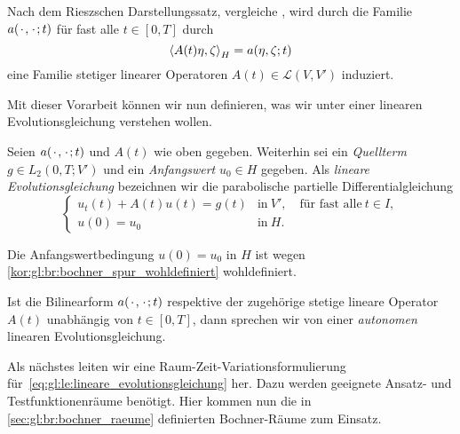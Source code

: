 Nach dem Rieszschen Darstellungssatz, vergleiche \cite[Theorem \S{}22.1]{Halmos:1957vd}, wird durch die Familie $a({\mkern2mu\cdot\mkern2mu}, {\mkern2mu\cdot\mkern2mu}; t)$ für fast alle $t \in [0, T]$ durch
\begin{equation}
    \left\langle A(t)\eta,\zeta\right\rangle_{H} = a(\eta, \zeta; t)
\end{equation}
eine Familie stetiger linearer Operatoren $A(t) \in \mathcal L(V, V')$ induziert.

Mit dieser Vorarbeit können wir nun definieren, was wir unter einer linearen Evolutionsgleichung verstehen wollen.

\begin{Definition}
\label{def:gl:le:lineare_evolutionsgleichung}
    Seien $a({\mkern2mu\cdot\mkern2mu}, {\mkern2mu\cdot\mkern2mu}; t)$ und $A(t)$ wie oben gegeben.
    Weiterhin sei ein \emph{Quellterm} $g \in L_{2}(0, T; V')$ und ein \emph{Anfangswert} $u_{0} \in H$ gegeben.
    Als \emph{lineare Evolutionsgleichung} bezeichnen wir die parabolische partielle Differentialgleichung
    \begin{equation}
        \label{eq:gl:le:lineare_evolutionsgleichung}
        \begin{cases}
            u_{t}(t) + A(t) u(t) = g(t)     &\text{in}~V', \quad \text{für fast alle}~t \in I, \\
            u(0) = u_{0}                    &\text{in}~H.
        \end{cases}
    \end{equation}
\end{Definition}

\begin{Bemerkung}
\leavevmode
\begin{thmenumerate}
    \item Die Anfangswertbedingung $u(0) = u_{0}$ in $H$ ist wegen \cref{kor:gl:br:bochner_spur_wohldefiniert} wohldefiniert.
    \item Ist die Bilinearform $a({\mkern2mu\cdot\mkern2mu}, {\mkern2mu\cdot\mkern2mu}; t)$ respektive der zugehörige stetige lineare Operator $A(t)$ unabhängig von $t \in [0, T]$, dann sprechen wir von einer \emph{autonomen} linearen Evolutionsgleichung.
\end{thmenumerate}
\end{Bemerkung}

Als nächstes leiten wir eine Raum-Zeit-Variationsformulierung für~\cref{eq:gl:le:lineare_evolutionsgleichung} her.
Dazu werden geeignete Ansatz- und Testfunktionenräume benötigt.
Hier kommen nun die in \cref{sec:gl:br:bochner_raeume} definierten Bochner-Räume zum Einsatz.

